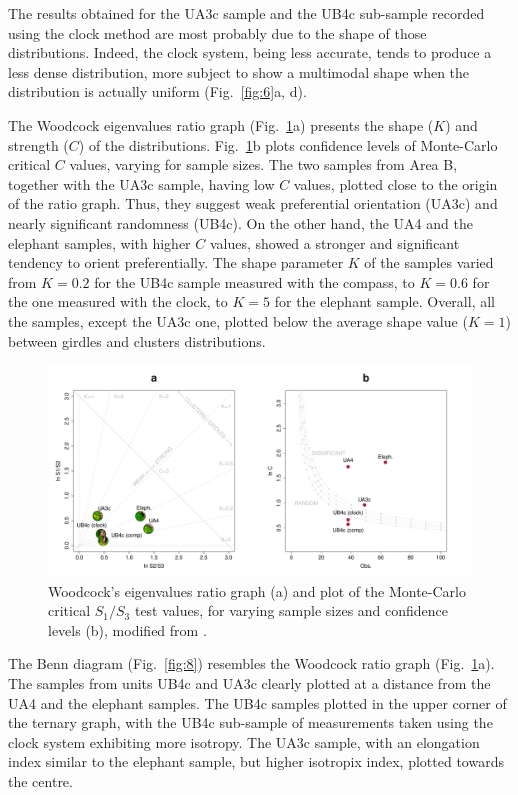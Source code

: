\documentclass[preprint,authoryear,times]{elsarticle} %
\begin{document}
The results obtained for the UA3c sample and the UB4c sub-sample recorded using the clock method are most probably due to the shape of those distributions. Indeed, the clock system, being less accurate, tends to produce a less dense distribution, more subject to show a multimodal shape when the distribution is actually uniform (Fig.~\ref{fig:6}a, d).

The Woodcock eigenvalues ratio graph (Fig.~\ref{fig:7}a) presents the shape ($K$) and strength ($C$) of the distributions. Fig.~\ref{fig:7}b plots confidence levels of Monte-Carlo critical $C$ values, varying for sample sizes. The two samples from Area B, together with the UA3c sample, having low $C$ values, plotted close to the origin of the ratio graph. Thus, they suggest weak preferential orientation (UA3c) and nearly significant randomness (UB4c). On the other hand, the UA4 and the elephant samples, with higher $C$ values, showed a stronger and significant tendency to orient preferentially. The shape parameter $K$ of the samples varied from $K=0.2$ for the UB4c sample measured with the compass, to $K=0.6$ for the one measured with the clock, to $K=5$ for the elephant sample. Overall, all the samples, except the UA3c one, plotted below the average shape value ($K=1$) between girdles and clusters distributions.

\begin{figure}[]
  \centering
  \includegraphics[width=1\textwidth]{../artwork/Fig7.pdf}
  \caption{Woodcock's eigenvalues ratio graph (a) and plot of the Monte-Carlo critical $S_1/S_3$ test values, for varying sample sizes and confidence levels (b), modified from \cite{Woodcock1983}.}
  \label{fig:7}
\end{figure}

The Benn diagram (Fig.~\ref{fig:8}) resembles the Woodcock ratio graph (Fig.~\ref{fig:7}a). The samples from units UB4c and UA3c clearly plotted at a distance from the UA4 and the elephant samples. The UB4c samples plotted in the upper corner of the ternary graph, with the UB4c sub-sample of measurements taken using the clock system exhibiting more isotropy. The UA3c sample, with an elongation index similar to the elephant sample, but higher isotropix index, plotted towards the centre.
\end{document}

